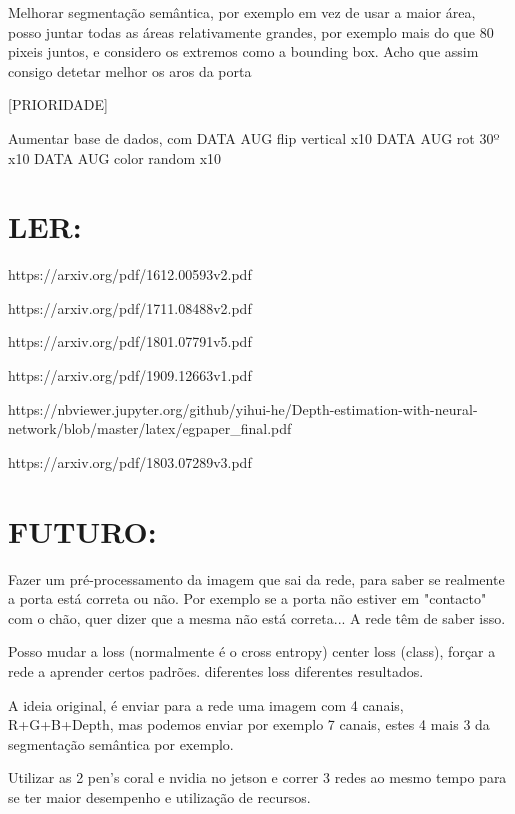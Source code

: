     \bigskip
    
    Melhorar segmentação semântica, por exemplo em vez de usar a maior área, posso juntar todas as áreas relativamente grandes, por exemplo mais do que 80 pixeis juntos, e considero os extremos como a bounding box. Acho que assim consigo detetar melhor os aros da porta
    
    \bigskip
    
    [PRIORIDADE]
    
    Aumentar base de dados, com 
    DATA AUG flip vertical      x10
    DATA AUG rot 30º            x10
    DATA AUG color random       x10
        
    
    \section{LER:}
    
    https://arxiv.org/pdf/1612.00593v2.pdf
    
    https://arxiv.org/pdf/1711.08488v2.pdf
    
    https://arxiv.org/pdf/1801.07791v5.pdf
    
    https://arxiv.org/pdf/1909.12663v1.pdf
    
    https://nbviewer.jupyter.org/github/yihui-he/Depth-estimation-with-neural-network/blob/master/latex/egpaper\_final.pdf
    
    https://arxiv.org/pdf/1803.07289v3.pdf
        
        
    \section{FUTURO:}
    
    Fazer um pré-processamento da imagem que sai da rede, para saber se realmente a porta está correta ou não. Por exemplo se a porta não estiver em "contacto" com o chão, quer dizer que a mesma não está correta... A rede têm de saber isso.
    
    Posso mudar a loss (normalmente é o cross entropy) center loss (class), forçar a rede a aprender certos padrões. diferentes loss diferentes resultados.
    
    A ideia original, é enviar para a rede uma imagem com 4 canais, R+G+B+Depth, mas podemos enviar por exemplo 7 canais, estes 4 mais 3 da segmentação semântica por exemplo.
    
    Utilizar as 2 pen's coral e nvidia no jetson e correr 3 redes ao mesmo tempo para se ter maior desempenho e utilização de recursos.
    
